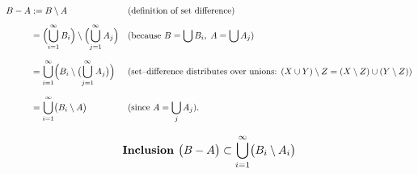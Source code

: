 \documentclass[12pt]{article}
\theoremstyle{definition} %
\theoremstyle{plain} %
\begin{document}
\pagebreak
\[
\begin{aligned}
B - A
&:= B\setminus A
      && \text{(definition of set difference)}\\[4pt]
&=   \Bigl(\bigcup_{i=1}^{\infty} B_i\Bigr)
      \setminus
      \Bigl(\bigcup_{j=1}^{\infty} A_j\Bigr)
      && \text{(because }B=\bigcup B_i,\; A=\bigcup A_j\text{)}\\[6pt]
&=   \bigcup_{i=1}^{\infty}\Bigl( B_i\setminus\bigl(\bigcup_{j=1}^{\infty} A_j\bigr) \Bigr)
      && \text{(set--difference distributes over unions: }
         (X\cup Y)\setminus Z=(X\setminus Z)\cup(Y\setminus Z))\\[6pt]
&=   \bigcup_{i=1}^{\infty}\bigl( B_i\setminus A \bigr)
      && \text{(since }A=\bigcup_j A_j\text{).}
\end{aligned}
\]

\[
\text{\bf Inclusion } \bigl(B - A\bigr)\subset
                     \bigcup_{i=1}^{\infty}\bigl(B_i\setminus A_i\bigr)
\]
\end{document}

